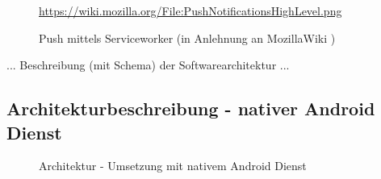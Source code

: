 \begin{figure}[htp] 
\caption{Push mittels Serviceworker (in Anlehnung an MozillaWiki \cite{MOZ_WIKI})}
\quelle\url{https://wiki.mozilla.org/File:PushNotificationsHighLevel.png}
\label{image_architektur-serviceworker-push}
\end{figure}  

... Beschreibung (mit Schema) der Softwarearchitektur ...

\newpage
\subsection{Architekturbeschreibung - nativer Android Dienst}

\begin{figure}[htp] 
\caption{Architektur - Umsetzung mit nativem Android Dienst }
\label{image_architektur-android-push}
\end{figure}  

